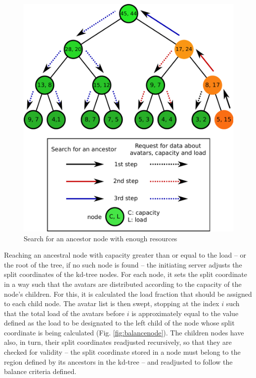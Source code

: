 \documentclass[acmjacm]{acmtrans2m}
\newcommand{\figurecaption}{Fig.}
\begin{document}
\begin{figure}
  \centering
  \includegraphics[width=0.8\linewidth]{images/ancestors}
  \caption{Search for an ancestor node with enough resources}
   \label{fig:ancestors}
\end{figure}

Reaching an ancestral node with capacity greater than or equal to the load -- or the root of the tree, if no such node is found -- the initiating server adjusts the split coordinates of the kd-tree nodes. For each node, it sets the split coordinate in a way such that the avatars are distributed according to the capacity of the node's children. For this, it is calculated the load fraction that should be assigned to each child node. The avatar list is then swept, stopping at the index $i$ such that the total load of the avatars before $i$ is approximately equal to the value defined as the load to be designated to the left child of the node whose split coordinate is being calculated (\figurecaption{} \ref{fig:balancenode}). The children nodes have also, in turn, their split coordinates readjusted recursively, so that they are checked for validity -- the split coordinate stored in a node must belong to the region defined by its ancestors in the kd-tree -- and readjusted to follow the balance criteria defined.
\end{document}
